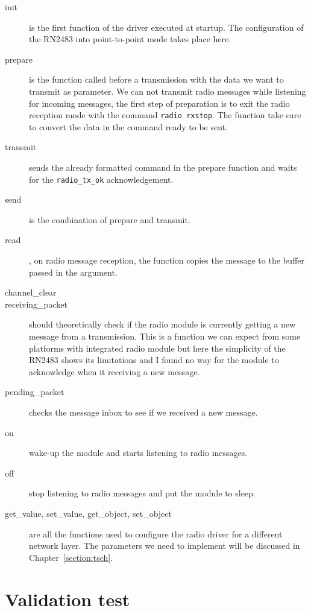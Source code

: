 \begin{description}
  \item[init] is the first function of the driver executed at startup.
    The configuration of the RN2483 into point-to-point mode takes place here.
  \item[prepare] is the function called before a transmission with the data we
    want to transmit as parameter. 
    We can not transmit radio messages while listening for incoming messages, the
    first step of preparation is to exit the radio reception mode with the
    command \lstinline{radio rxstop}.
    The function take care to convert the data in the command ready to be sent.
  \item[transmit] sends the already formatted command in the prepare function and
    waits for the \lstinline{radio_tx_ok} acknowledgement.
  \item[send] is the combination of prepare and transmit.
  \item[read], on radio message reception, the function copies the 
    message to the buffer passed in the argument.
  \item[channel\_clear]
  \item[receiving\_packet] should theoretically check if the radio module is
    currently getting a new message from a transmission. This is a function we
    can expect from some platforms with integrated radio module but here the
    simplicity of the RN2483 shows its limitations and I found no way for the module
    to acknowledge when it receiving a new message.
  \item[pending\_packet] checks the message inbox to see if we received a new
    message.
  \item[on] wake-up the module and starts listening to radio messages.
  \item[off] stop listening to radio messages and put the module to sleep.
  \item[get\_value, set\_value, get\_object, set\_object] are all the functions used
    to configure the radio driver for a different network layer. 
    The parameters we need to implement will be discussed in Chapter~\ref{section:tsch}.
\end{description}


\section{Validation test}

